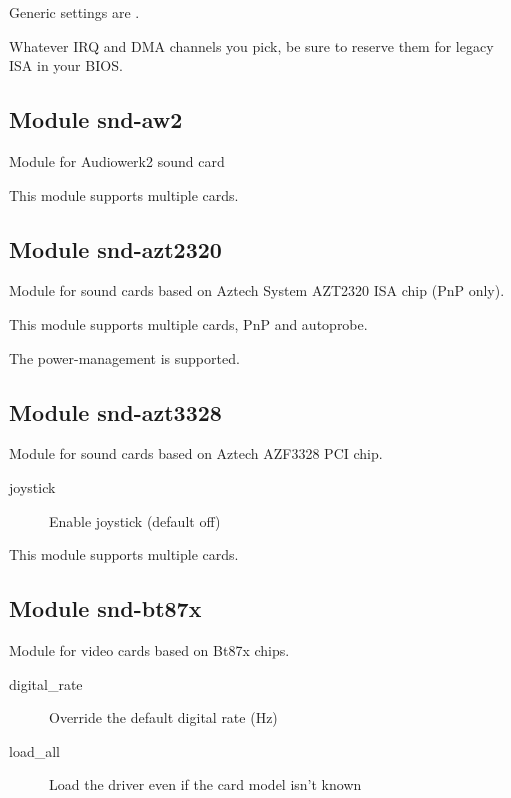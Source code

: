 \documentclass[a4paper,8pt,english]{sphinxmanual}
\begin{document}
Generic settings are .

Whatever IRQ and DMA channels you pick, be sure to reserve them for
legacy ISA in your BIOS.


\subsection{Module snd-aw2}
\label{sound/alsa-configuration:module-snd-aw2}
Module for Audiowerk2 sound card

This module supports multiple cards.


\subsection{Module snd-azt2320}
\label{sound/alsa-configuration:module-snd-azt2320}
Module for sound cards based on Aztech System AZT2320 ISA chip (PnP only).

This module supports multiple cards, PnP and autoprobe.

The power-management is supported.


\subsection{Module snd-azt3328}
\label{sound/alsa-configuration:module-snd-azt3328}
Module for sound cards based on Aztech AZF3328 PCI chip.
\begin{description}
\item[{joystick}] \leavevmode
Enable joystick (default off)

\end{description}

This module supports multiple cards.


\subsection{Module snd-bt87x}
\label{sound/alsa-configuration:module-snd-bt87x}
Module for video cards based on Bt87x chips.
\begin{description}
\item[{digital\_rate}] \leavevmode
Override the default digital rate (Hz)

\item[{load\_all}] \leavevmode
Load the driver even if the card model isn't known

\end{description}
\end{document}
